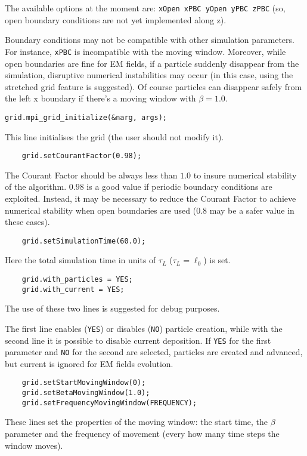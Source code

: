 \documentclass[11pt,a4paper]{report}
\begin{document}
The available options at the moment are: \verb+xOpen xPBC yOpen yPBC zPBC+ 
(so, open boundary conditions are not yet implemented along z).

Boundary conditions may not be compatible with other simulation parameters. For instance, \verb+xPBC+ is incompatible with the moving window. Moreover, while open boundaries are fine for EM fields, if a particle suddenly disappear from the simulation, disruptive numerical instabilities may occur (in this case, using the stretched grid feature is suggested). Of course particles can disappear safely from the left x boundary if there's a moving window with $\beta = 1.0$.

\begin{lstlisting}[backgroundcolor=\color{no_modify}]
	grid.mpi_grid_initialize(&narg, args);
\end{lstlisting}
This line initialises the grid (the user should not modify it). 
\begin{lstlisting}
	grid.setCourantFactor(0.98);
\end{lstlisting}
The Courant Factor should be always less than $1.0$ to insure numerical stability of the algorithm. $0.98$ is a good value if periodic boundary conditions are exploited. Instead, it may be necessary to reduce the Courant Factor to achieve numerical stability when open boundaries are used ($0.8$ may be a safer value in these cases).
\begin{lstlisting}
	grid.setSimulationTime(60.0);
\end{lstlisting}
Here the total simulation time in units of $\tau_L$ ($\tau_L=\ell_0$) is set.
\begin{lstlisting}
	grid.with_particles = YES;
	grid.with_current = YES;
\end{lstlisting}
The use of these two lines is suggested for debug purposes.

The first line enables (\verb+YES+) or disables (\verb+NO+) particle creation, while with the second line it is possible to disable current deposition. If \verb+YES+ for the first parameter and \verb+NO+ for the second are selected, particles are created and advanced, but current is ignored for EM fields evolution.
\begin{lstlisting}
	grid.setStartMovingWindow(0);
	grid.setBetaMovingWindow(1.0);
	grid.setFrequencyMovingWindow(FREQUENCY);
\end{lstlisting}
These lines set the properties of the moving window: the start time, the $\beta$ parameter and the frequency of movement (every how many time steps the window moves).
\end{document}
